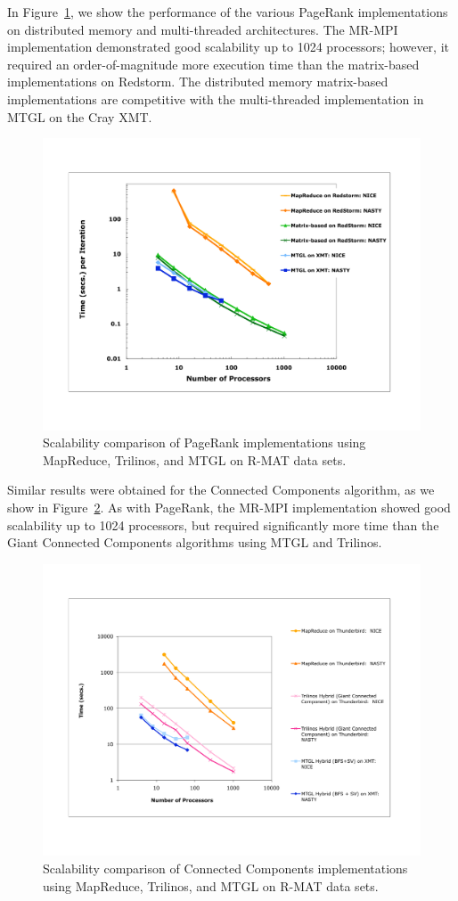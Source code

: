 In Figure~\ref{f:prbig}, we show the performance 
of the various PageRank
implementations on distributed memory and multi-threaded architectures.
The MR-MPI implementation demonstrated good scalability up to 1024 processors; 
however, it required an order-of-magnitude
more execution time than the matrix-based implementations on Redstorm.  
The distributed memory matrix-based
implementations are competitive with the multi-threaded implementation
in MTGL on the Cray XMT.

\begin{figure}[htb]
\includegraphics[width=\textwidth]{fig_pagerank_big.pdf}
\caption{Scalability comparison of PageRank implementations using MapReduce,
Trilinos, and MTGL on R-MAT data sets.}
\label{f:prbig}
\end{figure}

Similar results were obtained for the Connected Components algorithm, as
we show in Figure~\ref{f:ccbig}.  As with PageRank, the MR-MPI implementation
showed good scalability up to 1024 processors, but required significantly
more time than the Giant Connected Components algorithms using MTGL and
Trilinos.

\begin{figure}[htb]
\includegraphics[width=\textwidth]{fig_cc_big.pdf}
\caption{Scalability comparison of Connected Components implementations using MapReduce,
Trilinos, and MTGL on R-MAT data sets.}
\label{f:ccbig}
\end{figure}

